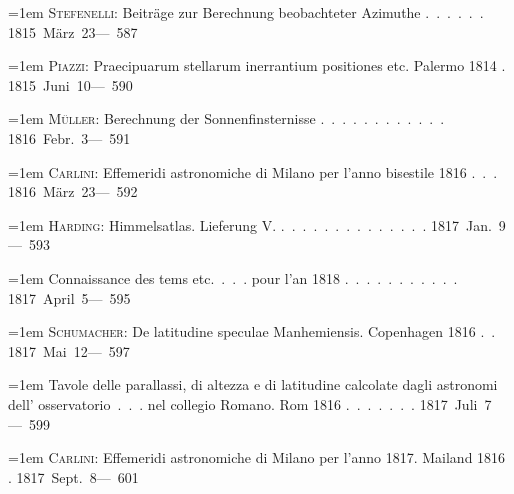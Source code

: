 \noindent\hangindent=1em \textsc{Stefenelli}: Beiträge zur Berechnung beobachteter Azimuthe \mbox{.\ .\ .\ .\ .\ .} \hfill\mbox{1815 März 23}\quad\mbox{--- 587}\par\smallskip
\noindent\hangindent=1em \textsc{Piazzi}: Praecipuarum stellarum inerrantium positiones etc. Palermo 1814 \mbox{.} \hfill\mbox{1815 Juni 10}\quad\mbox{--- 590}\par\smallskip
\noindent\hangindent=1em \textsc{Müller}: Berechnung der Sonnenfinsternisse \mbox{.\ .\ .\ .\ .\ .\ .\ .\ .\ .\ .\ .} \hfill\mbox{1816 Febr. 3}\quad\mbox{--- 591}\par\smallskip
\noindent\hangindent=1em \textsc{Carlini}: Effemeridi astronomiche di Milano per l'anno bisestile 1816 \mbox{.\ .\ .} \hfill\mbox{1816 März 23}\quad\mbox{--- 592}\par\smallskip
\noindent\hangindent=1em \textsc{Harding}: Himmelsatlas. Lieferung V. \mbox{.\ .\ .\ .\ .\ .\ .\ .\ .\ .\ .\ .\ .\ .} \hfill\mbox{1817 Jan. 9}\quad\mbox{--- 593}\par\smallskip
\noindent\hangindent=1em Connaissance des tems etc.\ .\ .\ . pour l'an 1818 \mbox{.\ .\ .\ .\ .\ .\ .\ .\ .\ .\ .} \hfill\mbox{1817 April 5}\quad\mbox{--- 595}\par\smallskip
\noindent\hangindent=1em \textsc{Schumacher}: De latitudine speculae Manhemiensis. Copenhagen 1816 \mbox{.\ .} \hfill\mbox{1817 Mai 12}\quad\mbox{--- 597}\par\smallskip
\noindent\hangindent=1em Tavole delle parallassi, di altezza e di latitudine calcolate dagli astronomi dell' osservatorio\ .\ .\ . nel collegio Romano. Rom 1816 \mbox{.\ .\ .\ .\ .\ .\ .} \hfill\mbox{1817 Juli 7}\quad\mbox{--- 599}\par\smallskip
\noindent\hangindent=1em \textsc{Carlini}: Effemeridi astronomiche di Milano per l'anno 1817. Mailand 1816 \mbox{.} \hfill\mbox{1817 Sept. 8}\quad\mbox{---\textperiodcentered{} 601}\par\smallskip
\endgroup
